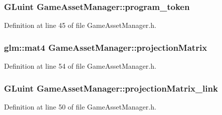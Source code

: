 \hypertarget{class_game_asset_manager_ad7bab17862e06ca692289f934b40548b}{}
\subsubsection[{program\+\_\+token}]{\setlength{\rightskip}{0pt plus 5cm}G\+Luint Game\+Asset\+Manager\+::program\+\_\+token\hspace{0.3cm}{\ttfamily [private]}}\label{class_game_asset_manager_ad7bab17862e06ca692289f934b40548b}


Definition at line 45 of file Game\+Asset\+Manager.\+h.

\hypertarget{class_game_asset_manager_a2bc76e9ac72dcf9490436a59dc3bc752}{}
\subsubsection[{projection\+Matrix}]{\setlength{\rightskip}{0pt plus 5cm}glm\+::mat4 Game\+Asset\+Manager\+::projection\+Matrix\hspace{0.3cm}{\ttfamily [private]}}\label{class_game_asset_manager_a2bc76e9ac72dcf9490436a59dc3bc752}


Definition at line 54 of file Game\+Asset\+Manager.\+h.

\hypertarget{class_game_asset_manager_aa98eb0fb89a0a39e29be33294b322855}{}
\subsubsection[{projection\+Matrix\+\_\+link}]{\setlength{\rightskip}{0pt plus 5cm}G\+Luint Game\+Asset\+Manager\+::projection\+Matrix\+\_\+link\hspace{0.3cm}{\ttfamily [private]}}\label{class_game_asset_manager_aa98eb0fb89a0a39e29be33294b322855}


Definition at line 50 of file Game\+Asset\+Manager.\+h.

\hypertarget{class_game_asset_manager_a1f0530749ec3ca5ee7925b2b70e8a8c2}{}

